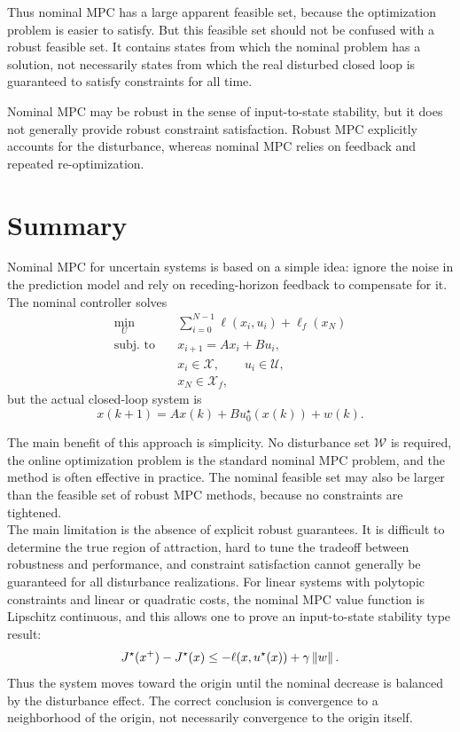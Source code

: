 Thus nominal MPC has a large apparent feasible set, because the optimization problem is easier
to satisfy. But this feasible set should not be confused with a robust feasible set. It contains
states from which the nominal problem has a solution, not necessarily states from which the real
disturbed closed loop is guaranteed to satisfy constraints for all time.

\begin{theorembox}
Nominal MPC may be robust in the sense of input-to-state stability, but it does not generally
provide robust constraint satisfaction. Robust MPC explicitly accounts for the disturbance,
whereas nominal MPC relies on feedback and repeated re-optimization.
\end{theorembox}

\section{Summary}

Nominal MPC for uncertain systems is based on a simple idea: ignore the noise in the prediction
model and rely on receding-horizon feedback to compensate for it. The nominal controller solves
\[
\begin{aligned}
    \min_U\quad
    &
    \sum_{i=0}^{N-1}\ell(x_i,u_i)+\ell_f(x_N)
    \\
    \text{subj. to}\quad
    &
    x_{i+1}=Ax_i+Bu_i,
    \\
    &
    x_i\in\mathcal X,\qquad u_i\in\mathcal U,
    \\
    &
    x_N\in\mathcal X_f,
\end{aligned}
\]
but the actual closed-loop system is
\[
    x(k+1)=Ax(k)+Bu_0^\star(x(k))+w(k).
\]

The main benefit of this approach is simplicity. No disturbance set \(\mathcal W\) is required,
the online optimization problem is the standard nominal MPC problem, and the method is often
effective in practice. The nominal feasible set may also be larger than the feasible set of robust
MPC methods, because no constraints are tightened.\\

The main limitation is the absence of explicit robust guarantees. It is difficult to determine the
true region of attraction, hard to tune the tradeoff between robustness and performance, and
constraint satisfaction cannot generally be guaranteed for all disturbance realizations. For
linear systems with polytopic constraints and linear or quadratic costs, the nominal MPC value
function is Lipschitz continuous, and this allows one to prove an input-to-state stability type
result:
\[
    J^\star(x^+)-J^\star(x)
    \leq
    -\ell(x,u^\star(x))+\gamma\left\lVert w \right\rVert.
\]
Thus the system moves toward the origin until the nominal decrease is balanced by the
disturbance effect. The correct conclusion is convergence to a neighborhood of the origin, not
necessarily convergence to the origin itself.
